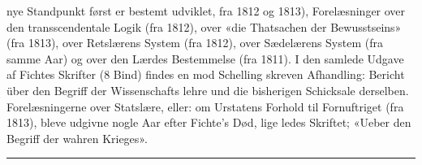\documentclass[12pt,a4paper]{book}
\newcommand{\divrule}{\begin{center}\rule{2cm}{0.4pt}\end{center}}
\begin{document}
nye Standpunkt først er bestemt udviklet, fra 1812 og 1813),
Forelæsninger over den transscendentale Logik (fra 1812), over
«die Thatsachen der Bewusstseins» (fra 1813), over Retslærens
System (fra 1812), over Sædelærens System (fra samme Aar)
og over den Lærdes Bestemmelse (fra 1811). I den samlede
Udgave af Fichtes Skrifter (8 Bind) findes en mod Schelling
skreven Afhandling: Bericht über den Begriff der Wissenschafts\-%
lehre und die bisherigen Schicksale derselben. Forelæsningerne
over Statslære, eller: om Urstatens Forhold til Fornuftriget
(fra 1813), bleve udgivne nogle Aar efter Fichte's Død, lige\-%
ledes Skriftet; «Ueber den Begriff der wahren Krieges».

\divrule
\end{document}
